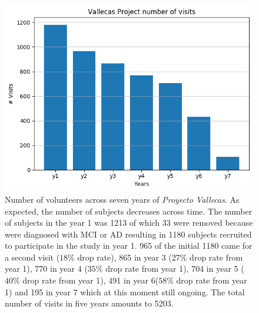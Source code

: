 \documentclass[11pt]{article}
\theoremstyle{definition}
\theoremstyle{remark}
\begin{document}
\begin{figure}[H]
        \centering
        \includegraphics[keepaspectratio, width=0.6\linewidth]{figures/Fig_visits}
        \caption{Number of volunteers across seven years of \emph{Proyecto Vallecas}. As expected, the number of subjects decreases across time. The number of subjects in the year 1 was 1213 of which 33 were removed because were diagnosed with MCI or AD resulting in 1180 subjects recruited to participate in the study in year 1. 965 of the initial 1180 came for a second visit ($18\%$ drop rate), 865 in year 3 ($27\%$ drop rate from year 1), 770 in year 4 ($35\%$ drop rate from year 1), 704 in year 5 ($40\%$ drop rate from year 1), 491 in year 6($58\%$ drop rate from year 1) and 195 in year 7 which at this moment still ongoing. The total number of visits in five years amounts to 5203.} \label{fig:pv5years}
\end{figure}


\end{document}

